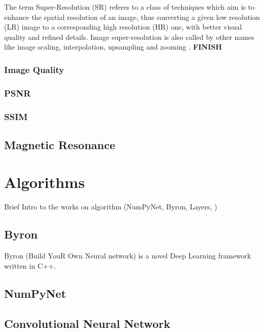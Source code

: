 \documentclass[12pt,a4paper]{report}
\begin{document}
The term Super-Resolution (SR) referes to a class of techniques which aim is to enhance the spatial resolution of an image, thus converting a given low resolution (LR) image to a corresponding high resolution (HR) one, with better visual quality and refined details.
Image super-resolution is also called by other names like image scaling, interpolation, upsampling and zooming \cite{survey-sr}.
 {\bf FINISH}

\subsection*{Image Quality}

\cite{psnr_ssim}

\subsection*{PSNR}
\subsection*{SSIM}

\section{Magnetic Resonance}


\chapter{Algorithms}

Brief Intro to the works on algorithm (NumPyNet, Byron, Layers, )

\section{Byron}

Byron (Build YouR Own Neural network) is a novel Deep Learning framework written in C++. 

\section{NumPyNet}

\section{Convolutional Neural Network}
\end{document}
